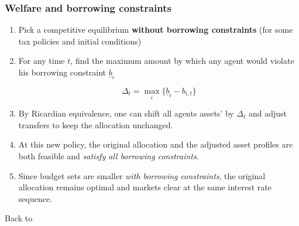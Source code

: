 \documentclass{beamer}
\begin{document}
 \begin{frame}[label=borrowing constraints]
 \frametitle{Welfare and borrowing constraints}
 \begin{enumerate}
 \item Pick a competitive equilibrium \textbf{without borrowing constraints} (for some tax policies and initial conditions)
 \item For any time $t$, find the maximum amount by which any agent would violate his borrowing constraint $\underline{b}_{i}$

 \[\Delta_t=\max_{i}\{\underline{b}_{i}-b_{i,t}\}\]

 \item By Ricardian equivalence, one can shift all agents assets' by $\Delta_t$ and adjust transfers to keep the allocation unchanged.
  \item At this new policy, the original allocation and the adjusted asset profiles are both feasible and \emph{satisfy all borrowing constraints.}
 \item Since budget sets are smaller \emph{with borrowing constraints}, the original allocation remains optimal and markets clear at the same interest rate sequence.
 \end{enumerate}
 Back to \hyperlink{back to borrowing constraints main}{}
\end{frame}

 
\end{document}
